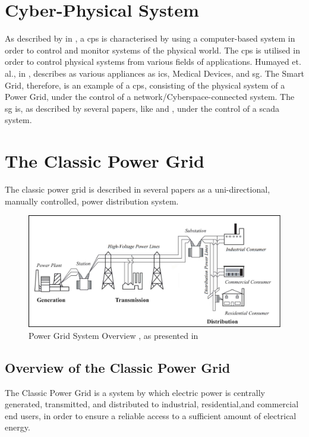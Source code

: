 \section{Cyber-Physical System}

As described by \citeauthor{humayed2017cyber} in \cite{humayed2017cyber}, a \acrfull{cps} is characterised by using a computer-based system in order to control and monitor systems of the physical world. The \acrshort{cps} is utilised in order to control physical systems from various fields of applications. Humayed et. al., in \cite{humayed2017cyber}, describes as various appliances as \acrfull{ics}, Medical Devices, and \acrlong{sg}.
The Smart Grid, therefore, is an example of a \acrfull{cps}, consisting of the physical system of a Power Grid, under the control of a network/Cyberspace-connected system. 
The \acrshort{sg} is, as described by several papers, like \cite{humayed2017cyber} and \cite{alcaraz2012security}, under the control of a \acrfull{scada} system.



\section{The Classic Power Grid }
The classic power grid is described in several papers as  a uni-directional, manually controlled, power distribution system.  

\begin{figure}[ht]
\includegraphics[width=\linewidth]{figures/Blume-PowerGrid-SystemOverView.png}
\caption[Power Grid System Overview]{Power Grid System Overview , as presented in \cite{BlumeStevenW2007Epsb}}
\label{fig:Blume-PowerGrid-SystemOverView}
\end{figure}



\subsection{Overview of the Classic Power Grid}
The Classic Power Grid is a system by which electric power is centrally generated, transmitted, and distributed to industrial, residential,and commercial end users, in order to ensure a reliable access to a sufficient amount of electrical energy. 

